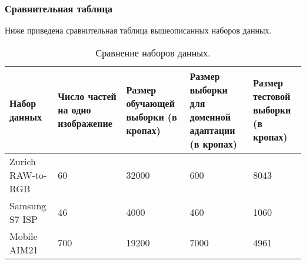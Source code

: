 \subsubsection{Сравнительная таблица}

Ниже приведена сравнительная таблица вышеописанных наборов данных.

\begin{table}[H]
    \caption{Сравнение наборов данных.}\label{tab:datasets}
    \begin{tabular}{|p{3.5cm}|p{2.7cm}|p{2.7cm}|p{2.7cm}|p{2.7cm}|}
        \hline
        {Набор данных} & {Число частей на одно изображение} & {Размер обучающей выборки (в кропах)} & {Размер выборки для доменной адаптации (в кропах)} & {Размер тестовой выборки (в кропах)} \\
        \hline
        Zurich RAW-to-RGB & 60 & 32000 & 600 & 8043 \\
        \hline
        Samsung S7 ISP & 46 & 4000 & 460 & 1060 \\
        \hline
        Mobile AIM21 & 700 & 19200 & 7000 & 4961 \\
        \hline
    \end{tabular}
\end{table}

